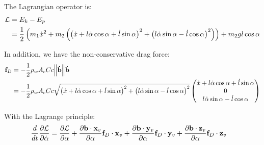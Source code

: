 The Lagrangian operator is:
\begin{align}
	\mathcal{L}{} & = {E}_{k} - {E}_{p} \nonumber                                                                                                                                                                                                                                                                                                                        \\
	        & = \frac{1}{2}  \left( {m}_{1} \dot{x}^2 + {m}_{2} \left(\left(\dot{x} + l \dot{\alpha}\cos{\ensuremath{\alpha}} + \dot{l}\sin{\ensuremath{\alpha}} \right)^2 + \left(l \dot{\alpha}\sin{\ensuremath{\alpha}} - \dot{l} \cos{\ensuremath{\alpha}}\right)^2\right) \right) + {m}_{2}gl\cos{\alpha}
\end{align}

In addition, we have the non-conservative drag force:
\begin{align}
	\ldvect{F}{D} & = - \frac{1}{2} \ldscal{\rho}{w} \ldscal{A}{c} \scal{C}{c} \norm{\vect{\dot{B}}}\vect{\dot{B}}     \nonumber                                                                                                                                                                              \\
	              & = - \frac{1}{2} \ldscal{\rho}{w} \ldscal{A}{c} \scal{C}{c} \sqrt{\left(\scal{\dot{x}} + \scal{l} \scal{\dot{\alpha}}\cos{\scal{\alpha}} + \scal{\dot{l}}\sin{\scal{\alpha}}\right)^2 + \left(\scal{l} \scal{\dot{\alpha}}\sin{\scal{\alpha}}-\scal{\dot{l}} \cos{\scal{\alpha}}\right)^2}
	\begin{pmatrix}
		\scal{\dot{x}} + \scal{l} \scal{\dot{\alpha}}\cos{\scal{\alpha}} + \scal{\dot{l}}\sin{\scal{\alpha}} \\
		0                                                                                                    \\
		\scal{l} \scal{\dot{\alpha}}\sin{\scal{\alpha}} - \scal{\dot{l}} \cos{\scal{\alpha}}
	\end{pmatrix}
\end{align}

With the Lagrange principle:
\begin{align}
	\frac{d}{dt} \frac{\partial \lagr{}}{\partial \scal{\dot{\alpha}}}
	 & = \frac{\partial \lagr{}}{\partial \scal{\alpha}}
	+ \frac{\partial \vect{B} \cdot \ldvect{x}{v}}{\partial \alpha} \ldvect{F}{D} \cdot \ldvect{x}{v}
	+ \frac{\partial \vect{B} \cdot \ldvect{y}{v}}{\partial \alpha} \ldvect{F}{D} \cdot \ldvect{y}{v}
	+ \frac{\partial \vect{B} \cdot \ldvect{z}{v}}{\partial \alpha} \ldvect{F}{D} \cdot \ldvect{z}{v} \label{cm_poapd_pbm_dotpd_lagrange}
\end{align}

